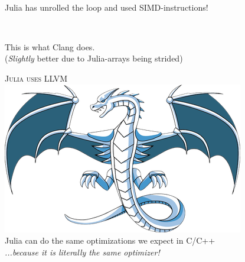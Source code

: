 \documentclass[14pt]{beamer}
\def\MyOrange{BurntOrange}
\begin{document}
\begin{frame}
    \centering
    \\
    {
        \begin{minipage}[c][.2\textheight][c]{\textwidth}
            \centering\scriptsize
            Julia has {\color{\MyOrange}unrolled the loop}
            and used {\color{\MyOrange}SIMD-instructions}!
        \end{minipage}
    }
\end{frame}


\begin{frame}
    \centering
    \\
    {
        \begin{minipage}[c][.2\textheight][c]{\textwidth}
            \centering\scriptsize
            This is what Clang does.\\
            {\color{gray}({\em Slightly} better due to
            Julia-arrays being strided)}
        \end{minipage}
    }
\end{frame}


\begin{frame}
    \centering
    {
    \begin{minipage}[c][.9\textheight][t]{\textwidth}
        \centering
        \textsc{Julia uses LLVM}\\[1em]
        \includegraphics[width=.5\textwidth]{LLVM_logo}\\[1em]
        \scriptsize
        Julia can do the same optimizations we
        expect in C/C++\\
        \vspace*{\fill}
        \pause
        {\em ...because it is literally the same optimizer!}
    \end{minipage}
    }
\end{frame}
\end{document}
